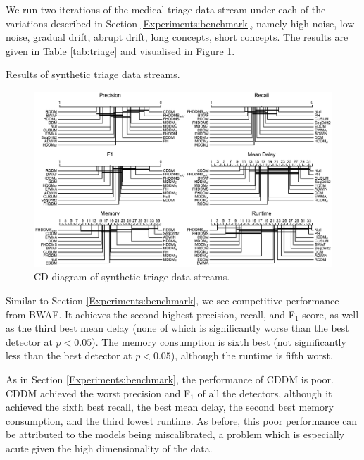 We run two iterations of the medical triage data stream under each of the variations described in Section \ref{Experiments:benchmark}, namely high noise, low noise, gradual drift, abrupt drift, long concepts, short concepts. The results are given in Table \ref{tab:triage} and visualised in Figure \ref{fig:triage}. 

\begin{table}
    \centering
    \caption{Results of synthetic triage data streams.}
    
    \label{tab:triage}
\end{table}

\begin{figure}
    \centering
    \includegraphics[width=\textwidth]{images/cd_diagrams/mimic.pdf}
    \caption{CD diagram of synthetic triage data streams.}
    \label{fig:triage}
\end{figure}

Similar to Section \ref{Experiments:benchmark}, we see competitive performance from BWAF. It achieves the second highest precision, recall, and F$_1$ score, as well as the third best mean delay (none of which is significantly worse than the best detector at $p<0.05$). The memory consumption is sixth best (not significantly less than the best detector at $p<0.05$), although the runtime is fifth worst.

As in Section \ref{Experiments:benchmark}, the performance of CDDM is poor. CDDM achieved the worst precision and F$_1$ of all the detectors, although it achieved the sixth best recall, the best mean delay, the second best memory consumption, and the third lowest runtime. As before, this poor performance can be attributed to the models being miscalibrated, a problem which is especially acute given the high dimensionality of the data. 

